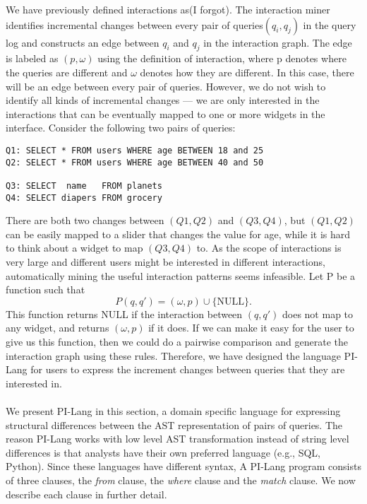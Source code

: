 We have previously defined interactions as(I forgot). The interaction miner identifies incremental changes between every pair of queries$ (q_i,q_j)$ in the query log and constructs an edge between $q_i$ and $q_j$ in the interaction graph. The edge is labeled as $(p,\omega)$ using the definition of interaction, where p denotes where the queries are different and $\omega$ denotes how they are different. In this case, there will be an edge between every pair of queries. However, we do not wish to identify all kinds of incremental changes --- we are only interested in the interactions that can be eventually mapped to one or more widgets in the interface. Consider the following two pairs of queries:
\begin{verbatim}
Q1: SELECT * FROM users WHERE age BETWEEN 18 and 25
Q2: SELECT * FROM users WHERE age BETWEEN 40 and 50

Q3: SELECT  name   FROM planets
Q4: SELECT diapers FROM grocery
\end{verbatim}
There are both two changes between $(Q1,Q2)$ and $(Q3,Q4)$, but $(Q1,Q2)$ can be easily mapped to a slider that changes the value for age, while it is hard to think about a widget to map $(Q3,Q4)$ to. As the scope of interactions is very large and  different users might be interested in different interactions,  automatically mining the useful interaction patterns seems infeasible. Let P be a function such that $$P(q,q') = (\omega,p) \cup \{\text{NULL}\}.$$
This function returns NULL if the interaction between $(q,q')$ does not map to any widget, and returns $(\omega,p)$ if it does. If we can make it easy for the user to give us this function, then we could do a pairwise comparison and generate the interaction graph using these rules.
Therefore, we have designed the language PI-Lang for users to express the increment changes between queries that they are interested in.\\\\
We present PI-Lang in this section, a domain specific language for expressing structural differences between the AST representation of pairs of queries. The reason PI-Lang works with low level AST transformation instead of string level differences is that analysts have their own preferred language (e.g., SQL, Python). Since these languages have different syntax, A PI-Lang program consists of three clauses, the \emph{from} clause, the \emph{where} clause and the \emph{match} clause. We now describe each clause in further detail.
